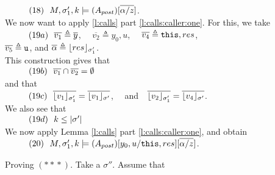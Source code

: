 \begin{description}
\\
$\SPS (18) \ \  \satDAssertFrom M  {\sigma_1'} {k}   {(A_{post})[\overline{\alpha/z}]}$.
\\
We now want to apply  \ref{l:calls} part \ref{l:calls:caller:one}. For this, we take
\\
$\SPS (19a) \ \  \overline {v_1} \triangleq \overline y$, \ \ $\overline {v_2} \triangleq  y_0, u$, \ \ $\overline {v_4} \triangleq  \prg{this}, res$, \\ $\overline {v_5} \triangleq  \prg{u}$, and
$\overline \alpha \triangleq \interpret {\sigma_1'} {res}$.
\\
This construction gives that  \\
$\SPS (19b) \ \  \overline {v_1}\cap   \overline{v_2} = \emptyset $
\\
and that
\\
$\SPS (19c) \ \ \overline {\interpret {\sigma_1'} {v_1} } = \overline {\interpret {\sigma'} {v_1} }$, \ \ and\ \  $\overline {\interpret {\sigma_1'}  {v_2} } = \overline {\interpret {\sigma'} {v_4} }$.
\\
We also see that \\
$\SPS (19d) \ \ k \leq \DepthSt {\sigma'}$
\\
We now apply Lemma \ref{l:calls} part \ref{l:calls:caller:one}, and obtain \\
$\SPS (20) \ \ \satDAssertFrom M  {\sigma_1'} {k}   {(A_{post})[y_0,u/\prg{this},res][\overline{\alpha/z}]}$.





 \vspace{.1cm}
Proving $(*\!*\!*)$. Take a $\sigma''$. Assume that\\
%



\end{description}

